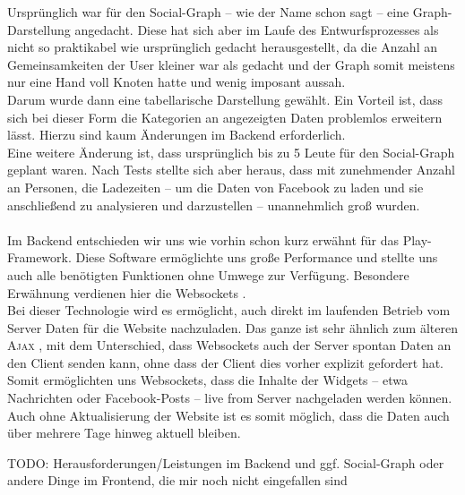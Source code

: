 \documentclass[10pt,a4paper]{report}
\begin{document}
Ursprünglich war für den Social-Graph -- wie der Name schon sagt -- eine Graph-Darstellung angedacht. Diese hat sich aber im Laufe des Entwurfsprozesses als nicht so praktikabel wie ursprünglich gedacht herausgestellt, da die Anzahl an Gemeinsamkeiten der User kleiner war als gedacht und der Graph somit meistens nur eine Hand voll Knoten hatte und wenig imposant aussah. \\
Darum wurde dann eine tabellarische Darstellung gewählt. Ein Vorteil ist, dass sich bei dieser Form die Kategorien an angezeigten Daten problemlos erweitern lässt. Hierzu sind kaum Änderungen im Backend erforderlich.\\ 
Eine weitere Änderung ist, dass ursprünglich bis zu 5 Leute für den Social-Graph geplant waren. Nach Tests stellte sich aber heraus, dass mit zunehmender Anzahl an Personen, die Ladezeiten -- um die Daten von Facebook zu laden und sie anschließend zu analysieren und darzustellen -- unannehmlich groß wurden.
\\\\
Im Backend entschieden wir uns wie vorhin schon kurz erwähnt für das Play-Framework. Diese Software ermöglichte uns große Performance und stellte uns auch alle benötigten Funktionen ohne Umwege zur Verfügung. Besondere Erwähnung verdienen hier die \glqq Websockets \grqq. \\
Bei dieser Technologie wird es ermöglicht, auch direkt im laufenden Betrieb vom Server Daten für die Website nachzuladen. Das ganze ist sehr ähnlich zum älteren \glqq \textsc{Ajax} \grqq, mit dem Unterschied, dass Websockets auch der Server spontan Daten an den Client senden kann, ohne dass der Client dies vorher explizit gefordert hat.\\
Somit ermöglichten uns Websockets, dass die Inhalte der Widgets -- etwa Nachrichten oder Facebook-Posts -- live from Server nachgeladen werden können. Auch ohne Aktualisierung der Website ist es somit möglich, dass die Daten auch über mehrere Tage hinweg aktuell bleiben.


	TODO: Herausforderungen/Leistungen im Backend und ggf. Social-Graph oder andere Dinge im Frontend, die mir noch nicht eingefallen sind
\end{document}
